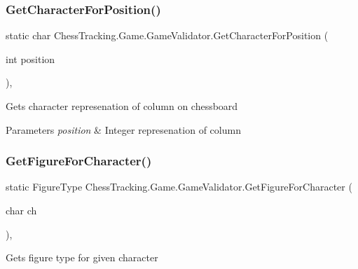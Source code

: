 \subsubsection{\texorpdfstring{GetCharacterForPosition()}{GetCharacterForPosition()}}
{\footnotesize\ttfamily static char Chess\+Tracking.\+Game.\+Game\+Validator.\+Get\+Character\+For\+Position (\begin{DoxyParamCaption}\item[{int}]{position }\end{DoxyParamCaption})\hspace{0.3cm}{\ttfamily [static]}, {\ttfamily [private]}}



Gets character represenation of column on chessboard 


\begin{DoxyParams}{Parameters}
{\em position} & Integer represenation of column\\
\hline
\end{DoxyParams}
\mbox{\label{class_chess_tracking_1_1_game_1_1_game_validator_a263009ed877e341ddf34a2dd2c0f4792}} 
\subsubsection{\texorpdfstring{GetFigureForCharacter()}{GetFigureForCharacter()}}
{\footnotesize\ttfamily static Figure\+Type Chess\+Tracking.\+Game.\+Game\+Validator.\+Get\+Figure\+For\+Character (\begin{DoxyParamCaption}\item[{char}]{ch }\end{DoxyParamCaption})\hspace{0.3cm}{\ttfamily [static]}, {\ttfamily [private]}}



Gets figure type for given character 

\mbox{\label{class_chess_tracking_1_1_game_1_1_game_validator_a6d2d0d1ac5503c09b716bb208a7fc877}} 
